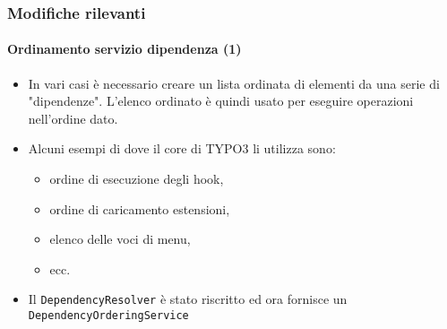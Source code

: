 \begin{frame}[fragile]
	\frametitle{Modifiche rilevanti}
	\framesubtitle{Ordinamento servizio dipendenza (1)}

	\begin{itemize}

		\item In vari casi è necessario creare un lista ordinata di elementi da una serie di "dipendenze".
			L'elenco ordinato è quindi usato per eseguire operazioni nell'ordine dato.

		\item Alcuni esempi di dove il core di TYPO3 li utilizza sono:

			\begin{itemize}
				\item ordine di esecuzione degli hook,
				\item ordine di caricamento estensioni,
				\item elenco delle voci di menu,
				\item ecc.
			\end{itemize}

		\item Il \texttt{DependencyResolver} è stato riscritto ed ora fornisce un 
			\texttt{DependencyOrderingService}

	\end{itemize}

\end{frame}


